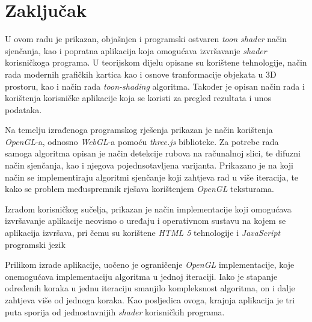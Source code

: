\section{Zaključak}

U ovom radu je prikazan, objašnjen i programski ostvaren \emph{toon shader} način sjenčanja, kao i popratna aplikacija koja omogućava izvršavanje \emph{shader} korisničkoga programa. U teorijskom dijelu opisane su korištene tehnologije, način rada modernih grafičkih kartica kao i osnove tranformacije objekata u 3D prostoru, kao i način rada \emph{toon-shading} algoritma. Također je opisan način rada i korištenja korisničke aplikacije koja se koristi za pregled rezultata i unos podataka.

Na temelju izrađenoga programskog rješenja prikazan je način korištenja \emph{OpenGL}-a, odnosno \emph{WebGL}-a pomoću \emph{three.js} biblioteke. Za potrebe rada samoga algoritma opisan je način detekcije rubova na računalnoj slici, te difuzni način sjenčanja, kao i njegova pojednsotavljena varijanta. Prikazano je na koji način se implementiraju algoritmi sjenčanje koji zahtjeva rad u više iteracija, te kako se problem međuspremnik rješava korištenjem \emph{OpenGL} teksturama.

Izradom korisničkog sučelja, prikazan je način implementacije koji omogućava izvršavanje aplikacije neovisno o uređaju i operativnom sustavu na kojem se aplikacija izvršava, pri čemu su korištene \emph{HTML 5} tehnologije i \emph{JavaScript} programski jezik

Prilikom izrade aplikacije, uočeno je ograničenje \emph{OpenGL} implementacije, koje onemogućava implementaciju algoritma u jednoj iteraciji. Iako je stapanje određenih koraka u jednu iteraciju smanjilo kompleksnost algoritma, on i dalje zahtjeva više od jednoga koraka. Kao posljedica ovoga, krajnja aplikacija je tri puta sporija od jednostavnijih \emph{shader}  korisničkih programa.